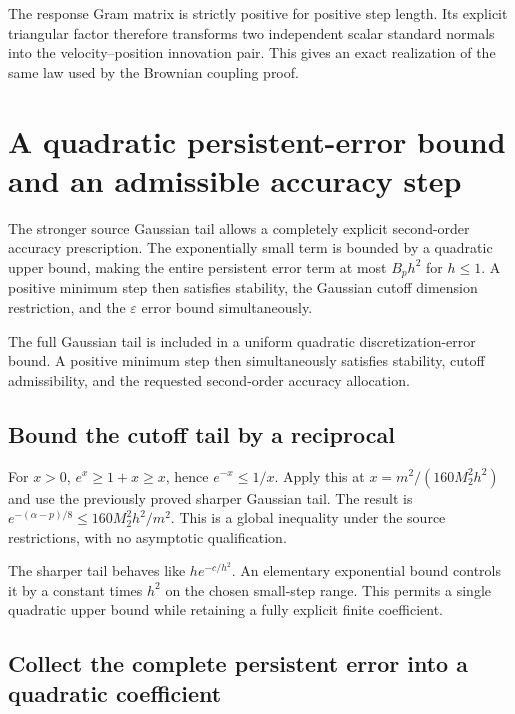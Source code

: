 \documentclass[11pt,a4paper]{report}
\begin{document}
The response Gram matrix is strictly positive for positive step length. Its explicit triangular factor therefore transforms two independent scalar standard normals into the velocity–position innovation pair. This gives an exact realization of the same law used by the Brownian coupling proof.

\section{\texorpdfstring{A quadratic persistent-error bound and an admissible accuracy step}{A quadratic persistent-error bound and an admissible accuracy step}}
\label{proof-module-KineticLangevin-SecondOrderBudget-lean}


The stronger source Gaussian tail allows a completely explicit second-order accuracy prescription. The exponentially small term is bounded by a quadratic upper bound, making the entire persistent error term at most \(B_p h^2\) for \(h\le1\). A positive minimum step then satisfies stability, the Gaussian cutoff dimension restriction, and the \(\varepsilon\) error bound simultaneously.



The full Gaussian tail is included in a uniform quadratic discretization-error bound. A positive minimum step then simultaneously satisfies stability, cutoff admissibility, and the requested second-order accuracy allocation.

\subsection{\texorpdfstring{Bound the cutoff tail by a reciprocal}{Bound the cutoff tail by a reciprocal}}
\label{report-step-KineticLangevin-SecondOrderBudget-lean-1}


For \(x>0\), \(e^x\ge1+x\ge x\), hence \(e^{-x}\le1/x\). Apply this at \(x=m^2/(160M_2^2h^2)\) and use the previously proved sharper Gaussian tail. The result is \(e^{-(\alpha-p)/8}\le160M_2^2h^2/m^2\). This is a global inequality under the source restrictions, with no asymptotic qualification.



The sharper tail behaves like \(h e^{-c/h^2}\). An elementary exponential bound controls it by a constant times \(h^2\) on the chosen small-step range. This permits a single quadratic upper bound while retaining a fully explicit finite coefficient.

\subsection{\texorpdfstring{Collect the complete persistent error into a quadratic coefficient}{Collect the complete persistent error into a quadratic coefficient}}
\label{report-step-KineticLangevin-SecondOrderBudget-lean-2}
\end{document}
